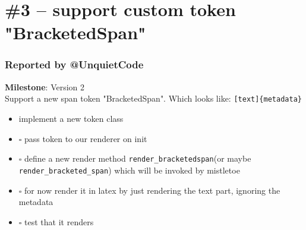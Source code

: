 \documentclass{article}
\begin{document}

{\section*{\#3 – support custom token "BracketedSpan"}}

{\subsubsection*{Reported by @UnquietCode}}
\textbf{Milestone}: Version 2\\

Support a new span token "BracketedSpan". Which looks like: \colorbox{code-background}{\texttt{[text]\{metadata\}}}\mbox\\
\mbox\\
\\

\begin{itemize}
\item \mbox{\ooalign{$\checkmark$\cr\hidewidth$\square$\hidewidth\cr}} implement a new token class 
 \item $\square$ pass token to our renderer on init 
 \item $\square$ define a new render method \colorbox{code-background}{\texttt{render\_bracketedspan}}\mbox\\
\mbox\\
 (or maybe \colorbox{code-background}{\texttt{render\_bracketed\_span}}\mbox\\
\mbox\\
) which will be invoked by mistletoe 
 \item $\square$ for now render it in latex by just rendering the text part, ignoring the metadata 
 \item $\square$ test that it renders 
\end{itemize}
\end{document}
